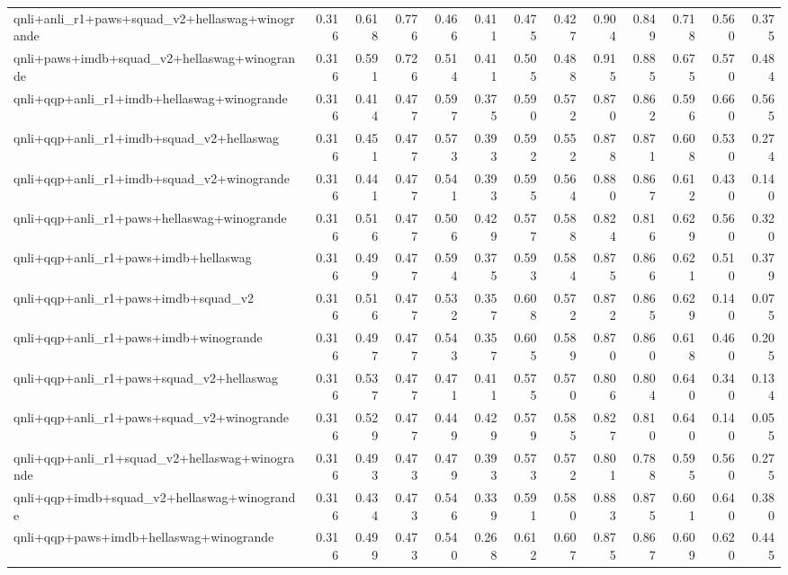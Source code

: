 \begin{table}[t]
\begin{tabular}{lrrrrrrrrrrrr}
    qnli+anli\_r1+paws+squad\_v2+hellaswag+winogrande & 0.316 & 0.618 & 0.776 & 0.466 & 0.411 & 0.475 & 0.427 & 0.904 & 0.849 & 0.718 & 0.560 & 0.375 \\
    qnli+paws+imdb+squad\_v2+hellaswag+winogrande & 0.316 & 0.591 & 0.726 & 0.514 & 0.411 & 0.505 & 0.488 & 0.915 & 0.885 & 0.675 & 0.570 & 0.484 \\
    qnli+qqp+anli\_r1+imdb+hellaswag+winogrande & 0.316 & 0.414 & 0.477 & 0.597 & 0.375 & 0.590 & 0.572 & 0.870 & 0.862 & 0.596 & 0.660 & 0.565 \\
    qnli+qqp+anli\_r1+imdb+squad\_v2+hellaswag & 0.316 & 0.451 & 0.477 & 0.573 & 0.393 & 0.592 & 0.552 & 0.878 & 0.871 & 0.608 & 0.530 & 0.274 \\
    qnli+qqp+anli\_r1+imdb+squad\_v2+winogrande & 0.316 & 0.441 & 0.477 & 0.541 & 0.393 & 0.595 & 0.564 & 0.880 & 0.867 & 0.612 & 0.430 & 0.140 \\
    qnli+qqp+anli\_r1+paws+hellaswag+winogrande & 0.316 & 0.516 & 0.477 & 0.506 & 0.429 & 0.577 & 0.588 & 0.824 & 0.816 & 0.629 & 0.560 & 0.320 \\
    qnli+qqp+anli\_r1+paws+imdb+hellaswag & 0.316 & 0.499 & 0.477 & 0.594 & 0.375 & 0.593 & 0.584 & 0.875 & 0.866 & 0.621 & 0.510 & 0.379 \\
    qnli+qqp+anli\_r1+paws+imdb+squad\_v2 & 0.316 & 0.516 & 0.477 & 0.532 & 0.357 & 0.608 & 0.572 & 0.872 & 0.865 & 0.629 & 0.140 & 0.075 \\
    qnli+qqp+anli\_r1+paws+imdb+winogrande & 0.316 & 0.497 & 0.477 & 0.543 & 0.357 & 0.605 & 0.589 & 0.870 & 0.860 & 0.618 & 0.460 & 0.205 \\
    qnli+qqp+anli\_r1+paws+squad\_v2+hellaswag & 0.316 & 0.537 & 0.477 & 0.471 & 0.411 & 0.575 & 0.570 & 0.806 & 0.804 & 0.640 & 0.340 & 0.134 \\
    qnli+qqp+anli\_r1+paws+squad\_v2+winogrande & 0.316 & 0.529 & 0.477 & 0.449 & 0.429 & 0.579 & 0.585 & 0.827 & 0.810 & 0.640 & 0.140 & 0.055 \\
    qnli+qqp+anli\_r1+squad\_v2+hellaswag+winogrande & 0.316 & 0.493 & 0.473 & 0.479 & 0.393 & 0.573 & 0.572 & 0.801 & 0.788 & 0.595 & 0.560 & 0.275 \\
    qnli+qqp+imdb+squad\_v2+hellaswag+winogrande & 0.316 & 0.434 & 0.473 & 0.546 & 0.339 & 0.591 & 0.580 & 0.883 & 0.875 & 0.601 & 0.640 & 0.380 \\
    qnli+qqp+paws+imdb+hellaswag+winogrande & 0.316 & 0.499 & 0.473 & 0.540 & 0.268 & 0.612 & 0.607 & 0.875 & 0.867 & 0.609 & 0.620 & 0.445 \\

\end{tabular}
\end{table}
